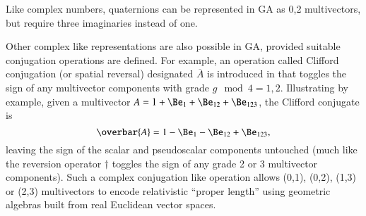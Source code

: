 Like complex numbers, quaternions can be represented in GA as 0,2 multivectors, but require three imaginaries instead of one.

Other complex like representations are also possible in GA, provided suitable conjugation operations are defined.
For example,
an operation called Clifford conjugation (or spatial reversal) designated \( \overbar{A} \) is introduced in \citep{baylis2004electrodynamics}
that toggles the sign of any multivector components with grade \( g \mod 4 = 1,2 \).
Illustrating by example, given a multivector
\( A = 1 + \Be_1 + \Be_{12} + \Be_{123} \), the Clifford conjugate is
\begin{dmath}\label{eqn:complex:60}
\overbar{A} = 1 - \Be_1 - \Be_{12} + \Be_{123},
\end{dmath}
leaving the sign of the scalar and pseudoscalar components untouched (much like the reversion operator \( \dagger \) toggles the sign of any grade 2 or 3 multivector components).
Such a complex conjugation like operation allows (0,1), (0,2), (1,3) or (2,3) multivectors to encode relativistic ``proper length'' using geometric algebras built from real Euclidean vector spaces.

